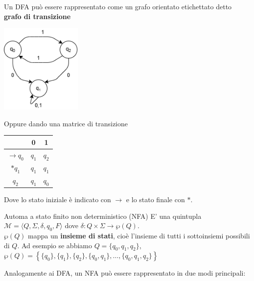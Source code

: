\documentclass[12pt, a4paper]{report}
\begin{document}
                \newpage
                Un DFA può essere rappresentato come un grafo orientato etichettato detto \textbf{grafo di transizione}
                \begin{center}
                    \includegraphics[width=0.3\textwidth]{Images/dfagraph.png}
                \end{center}
                Oppure dando una matrice di transizione
                \begin{center}
                    \begin{tabular}{|c|c|c|}
                        \hline
                         & 0 & 1 \\
                        \hline
                        $\displaystyle \to q_0$ & $q_1$ & $q_2$\\
                        \hline
                        $*q_1$& $q_1$ & $q_1$ \\
                        \hline
                        $q_2$ & $q_1$ & $q_0$ \\
                        \hline
                    \end{tabular}
                \end{center}
                Dove lo stato iniziale è indicato con $\to$ e lo stato finale con $*$.
                \begin{definitionbox}{Automa a stato finito non deterministico (NFA)}{}
                    E' una quintupla $\mathcal{M}=\langle Q,\Sigma, \delta, q_0, F\rangle$ dove $\delta:Q\times\Sigma\to\wp(Q)$.\\
                    $\wp(Q)$ mappa un \textbf{insieme di stati}, cioè l'insieme di tutti i sottoinsiemi possibili di $Q$. Ad esempio se abbiamo $Q=\{q_0,q_1,q_2\}$, $\wp(Q)=\left\{\{q_0\},\{q_1\},\{q_2\},\{q_0,q_1\},\ldots,\{q_0,q_1,q_2\}\right\}$
                \end{definitionbox}
                Analogamente ai DFA, un NFA può essere rappresentato in due modi principali:
\end{document}
